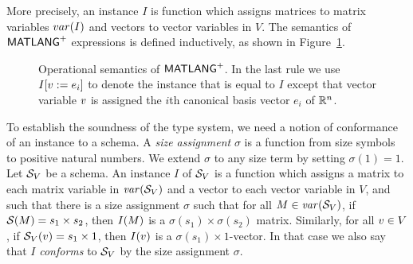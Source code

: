 More precisely,
an instance $I$ is function which assigns  matrices to matrix variables $var(I)$ and vectors to vector variables in $V$.
The semantics of $\mathsf{MATLANG}^{\sf +}$ expressions is defined inductively, as shown in Figure~\ref{fig:semantics}.
\begin{figure}
\caption{Operational semantics of $\mathsf{MATLANG}^{\sf +}$. In the last rule we use $I[v:=e_i]$ to denote the instance that is equal to $I$ except that vector variable $v$ is assigned the $i$th canonical basis vector $e_i$ of $\mathbb{R}^n$.
}\label{fig:semantics}
\end{figure}



To establish the soundness of the type system,
we need a notion of conformance of an instance to a schema. A \emph{size assignment} $\sigma$ is a function
from size symbols to positive natural numbers.  We extend
$\sigma$ to any size term by setting $\sigma(1) = 1$.  
Let $\mathcal{S}_V$ be a schema. An instance $I$ of $\mathcal{S}_V$ is a
function which assigns a matrix to each matrix variable in $\operatorname{\mathit{var}}(\mathcal{S}_V)$ and a vector to each vector variable in $V$,
and such that there is a size assignment $\sigma$ such
that for all $M \in \operatorname{\mathit{var}}(\mathcal{S}_V)$, if $\mathcal{S}(M) = s_1 \times s_2$,
then $I(M)$ is a $\sigma(s_1) \times \sigma(s_2)$ matrix.  Similarly,
for all $v\in V$, if $\mathcal{S}_V(v)=s_1\times 1$, then $I(v)$ is a
$\sigma(s_1)\times 1$-vector.
In
that case we also say that $I$
\emph{conforms} to $\mathcal{S}_V$ by the size assignment $\sigma$.

